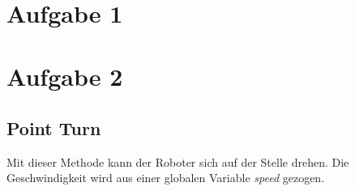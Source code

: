 \documentclass{../Vorlage/mat}
\begin{document}
 \\

\section*{Aufgabe 1}

\section*{Aufgabe 2}

\subsection*{Point Turn}
Mit dieser Methode kann der Roboter sich auf der Stelle drehen. Die Geschwindigkeit wird aus einer globalen Variable \textit{speed} gezogen.

\end{document}
